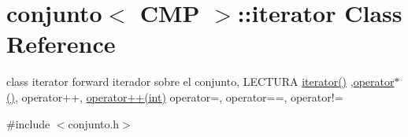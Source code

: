 \hypertarget{classconjunto_1_1iterator}{\section{conjunto$<$ C\-M\-P $>$\-:\-:iterator Class Reference}
\label{classconjunto_1_1iterator}
}


class iterator forward iterador sobre el conjunto, L\-E\-C\-T\-U\-R\-A \hyperlink{classconjunto_1_1iterator_a3f22236830d397ec750b795e4358492d}{iterator()} ,\hyperlink{classconjunto_1_1iterator_a0c53f65ff17cb959685cf42128da0520}{operator$\ast$()}, operator++, \hyperlink{classconjunto_1_1iterator_aaa2face7f36e8940595dc6f0e1159865}{operator++(int)} operator=, operator==, operator!=  




{\ttfamily \#include $<$conjunto.\-h$>$}

